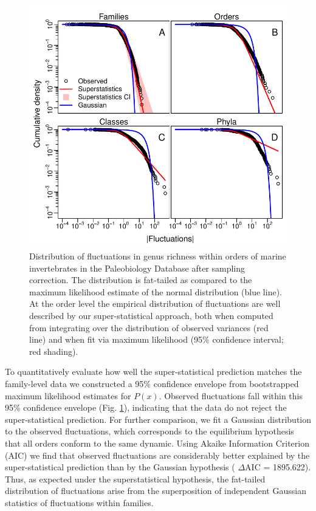 \documentclass[12pt]{article}
\let\citep=\cite
\begin{document}
\begin{figure}[!h]
  \centering
  \includegraphics[scale=1]{../../fig_Px.pdf} 
  \caption[Order-level distribution of richness
  fluctuations]{Distribution of fluctuations in genus richness within
    orders of marine invertebrates in the Paleobiology Database
    \citep{alroy08} after sampling correction. The distribution is
    fat-tailed as compared to the maximum likelihood estimate of the
    normal distribution (blue line).  At the order level the empirical
    distribution of fluctuations are well described by our
    super-statistical approach, both when computed from integrating
    over the distribution of observed variances (red line) and when
    fit via maximum likelihood (95\% confidence interval; red
    shading).}
  \label{fig:Px}
\end{figure}

To quantitatively evaluate how well the super-statistical prediction
matches the family-level data we constructed a 95\% confidence
envelope from bootstrapped maximum likelihood estimates for
$P(x)$. Observed fluctuations fall within this 95\% confidence
envelope (Fig. \ref{fig:Px}), indicating that the data do not reject
the super-statistical prediction. For further comparison, we fit a
Gaussian distribution to the observed fluctuations, which corresponds
to the equilibrium hypothesis that all orders conform to the same
dynamic. Using Akaike Information Criterion (AIC) we find that
observed fluctuations are considerably better explained by the
super-statistical prediction than by the Gaussian hypothesis ({\small
  $\Delta$}AIC = 1895.622). Thus, as expected under the
superstatistical hypothesis, the fat-tailed distribution of
fluctuations arise from the superposition of independent Gaussian
statistics of fluctuations within families.
\end{document}
